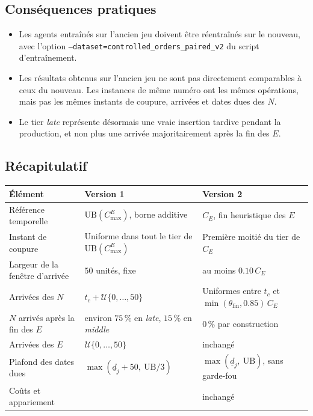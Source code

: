 \documentclass[11pt,a4paper]{article}
\newcommand{\UB}{\mathrm{UB}}
\newcommand{\CE}{C_E}
\begin{document}
\subsection{Conséquences pratiques}

\begin{itemize}
  \item Les agents entraînés sur l'ancien jeu doivent être réentraînés sur le nouveau, avec l'option \texttt{--dataset=controlled\_orders\_paired\_v2} du script d'entraînement.
  \item Les résultats obtenus sur l'ancien jeu ne sont pas directement comparables à ceux du nouveau. Les instances de même numéro ont les mêmes opérations, mais pas les mêmes instants de coupure, arrivées et dates dues des $N$.
  \item Le tier \emph{late} représente désormais une vraie insertion tardive pendant la production, et non plus une arrivée majoritairement après la fin des $E$.
\end{itemize}

\subsection{Récapitulatif}

\begin{center}
\begin{tabular}{p{3.6cm} p{5.2cm} p{5.2cm}}
\toprule
Élément & Version 1 & Version 2 \\
\midrule
Référence temporelle & $\UB(C^E_{\max})$, borne additive & $\CE$, fin heuristique des $E$ \\
Instant de coupure & Uniforme dans tout le tier de $\UB(C^E_{\max})$ & Première moitié du tier de $\CE$ \\
Largeur de la fenêtre d'arrivée & $50$ unités, fixe & au moins $0.10\,\CE$ \\
Arrivées des $N$ & $t_c + \mathcal{U}\{0,\dots,50\}$ & Uniformes entre $t_c$ et $\min(\theta_{\mathrm{fin}}, 0.85)\,\CE$ \\
$N$ arrivés après la fin des $E$ & environ $75\,\%$ en \emph{late}, $15\,\%$ en \emph{middle} & $0\,\%$ par construction \\
Arrivées des $E$ & $\mathcal{U}\{0,\dots,50\}$ & inchangé \\
Plafond des dates dues & $\max(\underline{d}_j + 50,\ \UB/3)$ & $\max(\underline{d}_j,\ \UB)$, sans garde-fou \\
Coûts et appariement & & inchangé \\
\bottomrule
\end{tabular}
\end{center}
\end{document}
